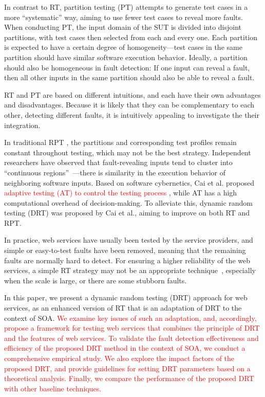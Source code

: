 \documentclass[10pt,journal,compsoc]{IEEEtran}
\begin{document}
In contrast to RT, partition testing (PT) attempts to generate test cases in a more ``systematic'' way, aiming to use fewer test cases to reveal more faults.
When conducting PT, the input domain of the SUT is divided into disjoint partitions, with test cases then selected from each and every one.
Each partition is expected to have a certain degree of homogeneity---test cases in the same partition should have similar software execution behavior.
Ideally, a partition should also be homogeneous in fault detection:
If one input can reveal a fault, then all other inputs in the same partition should also be able to reveal a fault.

RT and PT are based on different intuitions, and each have their own advantages and disadvantages.
Because it is likely that they can be complementary to each other, detecting different faults, it is intuitively appealing to investigate the their integration.

In traditional RPT \cite{cai2009random}, the partitions and corresponding test profiles remain constant throughout testing, which may not be the best strategy.
Independent researchers have observed that fault-revealing inputs tend to cluster into ``continuous regions''~\cite{Ammann88, Finelli91}---there is similarity in the execution behavior of neighboring software inputs.
Based on software cybernetics, Cai et al. proposed \textcolor{red}{adaptive testing (AT) to control the testing process \cite{cai2004optimal}}, while AT has a high computational overhead of decision-making. To alleviate this, dynamic random testing (DRT) \cite{cai2009random} was proposed by Cai et al., aiming to improve on both RT and RPT.

In practice, web services have usually been tested by the service providers, and simple or easy-to-test faults have been removed, meaning that the remaining faults are normally hard to detect.
For ensuring a higher reliability of the web services, a simple RT strategy may not be an appropriate technique~\cite{li2014two}, especially when the scale is large, or there are some stubborn faults.

In this paper, we present a dynamic random testing (DRT) approach for web services, as an enhanced version of RT that is an adaptation of DRT to the context of SOA.
\textcolor{red}{We examine key issues of such an adaptation, and, accordingly, propose a framework for testing web services that combines the principle of DRT \cite{cai2009random} and the features of web services. To validate the fault detection effectiveness and efficiency of the proposed DRT method in the context of SOA, we conduct a comprehensive empirical study. We also explore the impact factors of the proposed DRT, and provide guidelines for setting DRT parameters based on a theoretical analysis. Finally, we compare the performance of the proposed DRT with other baseline techniques.}
\end{document}
